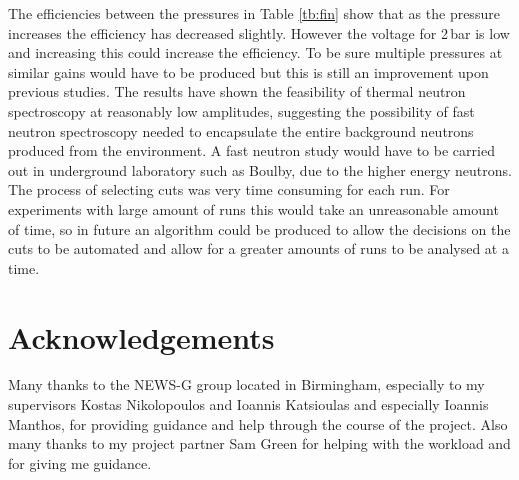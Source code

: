 \documentclass[a4paper]{article}
\begin{document}
\newline The efficiencies between the pressures in Table \ref{tb:fin} show that as the pressure increases the efficiency has decreased slightly. However the voltage for 2\,bar is low and increasing this could increase the efficiency. To be sure multiple pressures at similar gains would have to be produced but this is still an improvement upon previous studies.
\newline The results have shown the feasibility of thermal neutron spectroscopy at reasonably low amplitudes, suggesting the possibility of fast neutron spectroscopy needed to encapsulate the entire background neutrons produced from the environment. A fast neutron study would have to be carried out in underground laboratory such as Boulby, due to the higher energy neutrons.
\newline The process of selecting cuts was very time consuming for each run. For experiments with large amount of runs this would take an unreasonable amount of time, so in future an algorithm could be produced to allow the decisions on the cuts to be automated and allow for a greater amounts of runs to be analysed at a time.
\section{Acknowledgements}
Many thanks to the NEWS-G group located in Birmingham, especially to my supervisors Kostas Nikolopoulos and Ioannis Katsioulas and especially Ioannis Manthos, for providing guidance and help through the course of the project. Also many thanks to my project partner Sam Green for helping with the workload and for giving me guidance.
\newpage


 
\end{document}
